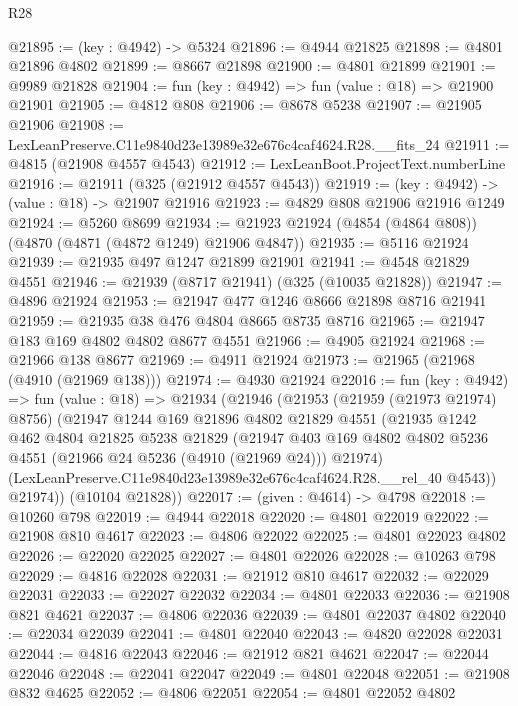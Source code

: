 \begin{lexlean}{R28}
\begin{coremodule}
@21895 := (key : @4942) -> @5324
@21896 := @4944 @21825
@21898 := @4801 @21896 @4802
@21899 := @8667 @21898
@21900 := @4801 @21899
@21901 := @9989 @21828
@21904 := fun (key : @4942) => fun (value : @18) => @21900 @21901
@21905 := @4812 @808
@21906 := @8678 @5238
@21907 := @21905 @21906
@21908 := LexLeanPreserve.C11e9840d23e13989e32e676c4caf4624.R28.__fits_24
@21911 := @4815 (@21908 @4557 @4543)
@21912 := LexLeanBoot.ProjectText.numberLine
@21916 := @21911 (@325 (@21912 @4557 @4543))
@21919 := (key : @4942) -> (value : @18) -> @21907 @21916
@21923 := @4829 @808 @21906 @21916 @1249
@21924 := @5260 @8699
@21934 := @21923 @21924 (@4854 (@4864 @808)) (@4870 (@4871 (@4872 @1249) @21906 @4847))
@21935 := @5116 @21924
@21939 := @21935 @497 @1247 @21899 @21901
@21941 := @4548 @21829 @4551
@21946 := @21939 (@8717 @21941) (@325 (@10035 @21828))
@21947 := @4896 @21924
@21953 := @21947 @477 @1246 @8666 @21898 @8716 @21941
@21959 := @21935 @38 @476 @4804 @8665 @8735 @8716
@21965 := @21947 @183 @169 @4802 @4802 @8677 @4551
@21966 := @4905 @21924
@21968 := @21966 @138 @8677
@21969 := @4911 @21924
@21973 := @21965 (@21968 (@4910 (@21969 @138)))
@21974 := @4930 @21924
@22016 := fun (key : @4942) =>
  fun (value : @18) =>
  @21934
    (@21946
      (@21953
        (@21959 (@21973 @21974) @8756)
        (@21947
          @1244
          @169
          @21896
          @4802
          @21829
          @4551
          (@21935
            @1242
            @462
            @4804
            @21825
            @5238
            @21829
            (@21947
              @403
              @169
              @4802
              @4802
              @5236
              @4551
              (@21966 @24 @5236 (@4910 (@21969 @24)))
              @21974)
            (LexLeanPreserve.C11e9840d23e13989e32e676c4caf4624.R28.__rel_40 @4543))
          @21974))
      (@10104 @21828))
@22017 := (given : @4614) -> @4798
@22018 := @10260 @798
@22019 := @4944 @22018
@22020 := @4801 @22019
@22022 := @21908 @810 @4617
@22023 := @4806 @22022
@22025 := @4801 @22023 @4802
@22026 := @22020 @22025
@22027 := @4801 @22026
@22028 := @10263 @798
@22029 := @4816 @22028
@22031 := @21912 @810 @4617
@22032 := @22029 @22031
@22033 := @22027 @22032
@22034 := @4801 @22033
@22036 := @21908 @821 @4621
@22037 := @4806 @22036
@22039 := @4801 @22037 @4802
@22040 := @22034 @22039
@22041 := @4801 @22040
@22043 := @4820 @22028 @22031
@22044 := @4816 @22043
@22046 := @21912 @821 @4621
@22047 := @22044 @22046
@22048 := @22041 @22047
@22049 := @4801 @22048
@22051 := @21908 @832 @4625
@22052 := @4806 @22051
@22054 := @4801 @22052 @4802

\end{coremodule}
\end{lexlean}
